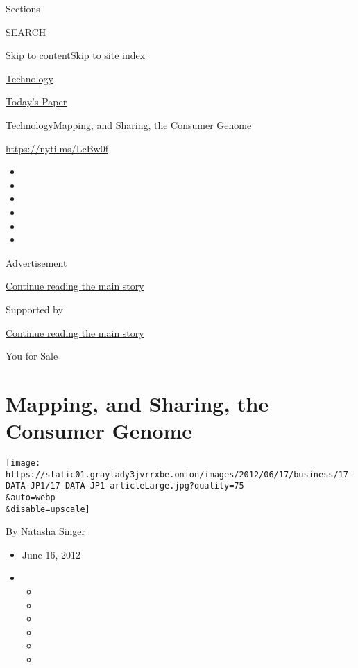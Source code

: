 Sections

SEARCH

\protect\hyperlink{site-content}{Skip to
content}\protect\hyperlink{site-index}{Skip to site index}

\href{https://www.nytimes3xbfgragh.onion/section/technology}{Technology}

\href{https://myaccount.nytimes3xbfgragh.onion/auth/login?response_type=cookie\&client_id=vi}{}

\href{https://www.nytimes3xbfgragh.onion/section/todayspaper}{Today's
Paper}

\href{/section/technology}{Technology}\textbar{}Mapping, and Sharing,
the Consumer Genome

\href{https://nyti.ms/LcBw0f}{https://nyti.ms/LcBw0f}

\begin{itemize}
\item
\item
\item
\item
\item
\item
\end{itemize}

Advertisement

\protect\hyperlink{after-top}{Continue reading the main story}

Supported by

\protect\hyperlink{after-sponsor}{Continue reading the main story}

You for Sale

\hypertarget{mapping-and-sharing-the-consumer-genome}{%
\section{Mapping, and Sharing, the Consumer
Genome}\label{mapping-and-sharing-the-consumer-genome}}

\texttt{[image: https://static01.graylady3jvrrxbe.onion/images/2012/06/17/business/17-DATA-JP1/17-DATA-JP1-articleLarge.jpg?quality=75\\\&auto=webp\\\&disable=upscale]}

By \href{https://www.nytimes3xbfgragh.onion/by/natasha-singer}{Natasha
Singer}

\begin{itemize}
\item
  June 16, 2012
\item
  \begin{itemize}
  \item
  \item
  \item
  \item
  \item
  \item
  \end{itemize}
\end{itemize}


